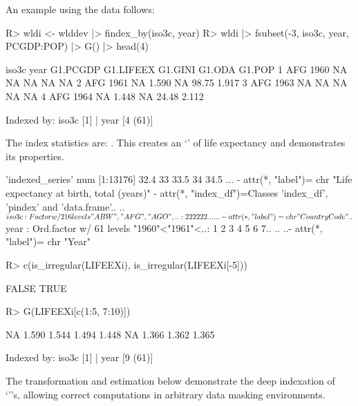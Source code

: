 \documentclass[article]{jss}
\newcommand{\class}[1]{`\code{#1}'}
\begin{document}
%
An example using the  data follows:
\begin{Schunk}
\begin{Sinput}
R> wldi <- wlddev |> findex_by(iso3c, year)
R> wldi |> fsubset(-3, iso3c, year, PCGDP:POP) |> G() |> head(4)
\end{Sinput}
\begin{Soutput}
  iso3c year G1.PCGDP G1.LIFEEX G1.GINI G1.ODA G1.POP
1   AFG 1960       NA        NA      NA     NA     NA
2   AFG 1961       NA     1.590      NA  98.75  1.917
3   AFG 1963       NA        NA      NA     NA     NA
4   AFG 1964       NA     1.448      NA  24.48  2.112

Indexed by:  iso3c [1] | year [4 (61)] 
\end{Soutput}
\end{Schunk}
The index statistics are: . This creates an \class{indexes\_series} of life expectancy and demonstrates its properties.
\begin{Schunk}
\begin{Soutput}
 'indexed_series' num [1:13176] 32.4 33 33.5 34 34.5 ...
 - attr(*, "label")= chr "Life expectancy at birth, total (years)"
 - attr(*, "index_df")=Classes 'index_df', 'pindex' and 'data.frame'..
  ..$ iso3c: Factor w/ 216 levels "ABW","AFG","AGO",..: 2 2 2 2 2 2 ..
  .. ..- attr(*, "label")= chr "Country Code"
  ..$ year : Ord.factor w/ 61 levels "1960"<"1961"<..: 1 2 3 4 5 6 7..
  .. ..- attr(*, "label")= chr "Year"
\end{Soutput}
\begin{Sinput}
R> c(is_irregular(LIFEEXi), is_irregular(LIFEEXi[-5]))
\end{Sinput}
\begin{Soutput}
[1] FALSE  TRUE
\end{Soutput}
\begin{Sinput}
R> G(LIFEEXi[c(1:5, 7:10)])
\end{Sinput}
\begin{Soutput}
[1]    NA 1.590 1.544 1.494 1.448    NA 1.366 1.362 1.365

Indexed by:  iso3c [1] | year [9 (61)] 
\end{Soutput}
\end{Schunk}
The transformation and estimation below demonstrate the deep indexation of \\ \class{indexed\_frame}'s, allowing correct computations in arbitrary data masking environments.
\end{document}
